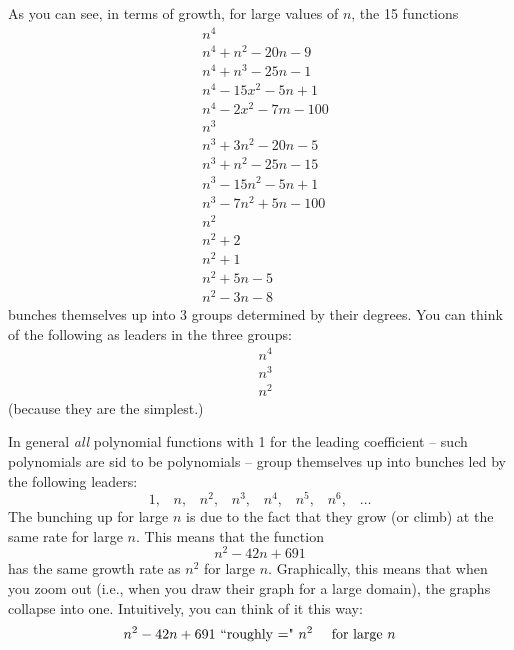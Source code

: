 As you can see, in terms of growth, for large values of $n$, the 15 functions
\begin{align*}
&n^4 \\
&n^4 + n^2 - 20n - 9 \\
&n^4 +  n^3 - 25n - 1 \\
&n^4 - 15x^2 - 5n + 1 \\
&n^4 - 2x^2 - 7m - 100 \\
&n^3 \\
&n^3 + 3n^2 - 20n - 5 \\
&n^3 +   n^2 - 25n - 15 \\
&n^3 - 15n^2 - 5n + 1 \\
&n^3 - 7n^2 + 5n - 100 \\
&n^2 \\
&n^2 + 2 \\
&n^2 + 1 \\
&n^2 + 5n - 5 \\
&n^2 - 3n - 8
\end{align*}
bunches themselves up into 3 groups determined by their degrees.
You can think of the following as leaders in the three groups:
\begin{align*}
&n^4 \\
&n^3 \\
&n^2
\end{align*}
(because they are the simplest.)

In general \textit{all} polynomial functions with 1 for the leading coefficient -- such polynomials
are sid to be  polynomials -- 
group themselves up into
bunches led by the following leaders:
\[
1, \,\,\,\,\,
n, \,\,\,\,\,
n^2, \,\,\,\,\,
n^3, \,\,\,\,\,
n^4, \,\,\,\,\,
n^5, \,\,\,\,\,
n^6, \,\,\,\,\,
\ldots
\]
The bunching up for large $n$ is due to the fact that they grow (or climb) at the same rate for large $n$.
This means that the function
\[
n^2 - 42n + 691
\]
has the same growth rate as $n^2$ for large $n$.
Graphically, this means that when you zoom out (i.e., when you draw their graph for a
large domain), the graphs collapse into one.
Intuitively, you can think of it this way:
\[
\text{$n^2 - 42n + 691$ \lq\lq roughly $=$" $n^2$ \,\,\,\,\ for large $n$}
\]

